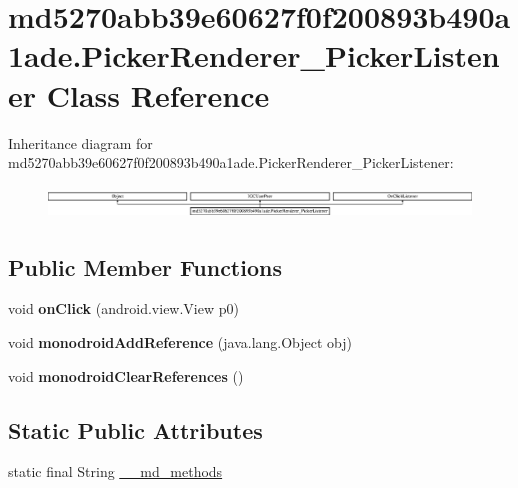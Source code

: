 \hypertarget{classmd5270abb39e60627f0f200893b490a1ade_1_1PickerRenderer__PickerListener}{}\section{md5270abb39e60627f0f200893b490a1ade.\+Picker\+Renderer\+\_\+\+Picker\+Listener Class Reference}
\label{classmd5270abb39e60627f0f200893b490a1ade_1_1PickerRenderer__PickerListener}
Inheritance diagram for md5270abb39e60627f0f200893b490a1ade.\+Picker\+Renderer\+\_\+\+Picker\+Listener\+:\begin{figure}[H]
\begin{center}
\leavevmode
\includegraphics[height=0.844646cm]{classmd5270abb39e60627f0f200893b490a1ade_1_1PickerRenderer__PickerListener}
\end{center}
\end{figure}
\subsection*{Public Member Functions}
\begin{DoxyCompactItemize}
\item 
\mbox{\label{classmd5270abb39e60627f0f200893b490a1ade_1_1PickerRenderer__PickerListener_a1a8816a4e33f89323152ddf1198f9650}} 
void {\bfseries on\+Click} (android.\+view.\+View p0)
\item 
\mbox{\label{classmd5270abb39e60627f0f200893b490a1ade_1_1PickerRenderer__PickerListener_ab0a8d648c8fcadf63fe47a153231ea10}} 
void {\bfseries monodroid\+Add\+Reference} (java.\+lang.\+Object obj)
\item 
\mbox{\label{classmd5270abb39e60627f0f200893b490a1ade_1_1PickerRenderer__PickerListener_a559d127bb4a4b85e43b4ab8970679f09}} 
void {\bfseries monodroid\+Clear\+References} ()
\end{DoxyCompactItemize}
\subsection*{Static Public Attributes}
\begin{DoxyCompactItemize}
\item 
static final String \hyperlink{classmd5270abb39e60627f0f200893b490a1ade_1_1PickerRenderer__PickerListener_a0364241ced938474af94b5858f99e10d}{\+\_\+\+\_\+md\+\_\+methods}
\end{DoxyCompactItemize}
